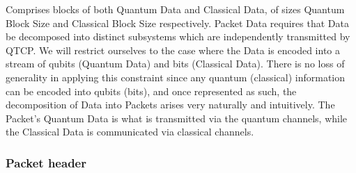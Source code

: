 \documentclass[aps,rmp,twocolumn,amsmath,amssymb,nofootinbib,superscriptaddress,longbibliography,floatfix]{revtex4-1}
\begin{document}
Comprises blocks of both {\sc Quantum Data} and {\sc Classical Data}, of sizes {\sc Quantum Block Size} and {\sc Classical Block Size} respectively. {\sc Packet Data} requires that {\sc Data} be decomposed into distinct subsystems which are independently transmitted by QTCP. We will restrict ourselves to the case where the {\sc Data} is encoded into a stream of qubits ({\sc Quantum Data}) and bits ({\sc Classical Data}). There is no loss of generality in applying this constraint since any quantum (classical) information can be encoded into qubits (bits), and once represented as such, the decomposition of {\sc Data} into {\sc Packets} arises very naturally and intuitively. The {\sc Packet's} {\sc Quantum Data} is what is transmitted via the quantum channels, while the {\sc Classical Data} is communicated via classical channels.

%
%

\subsubsection{Packet header} \label{sec:packet_header}
\end{document}
